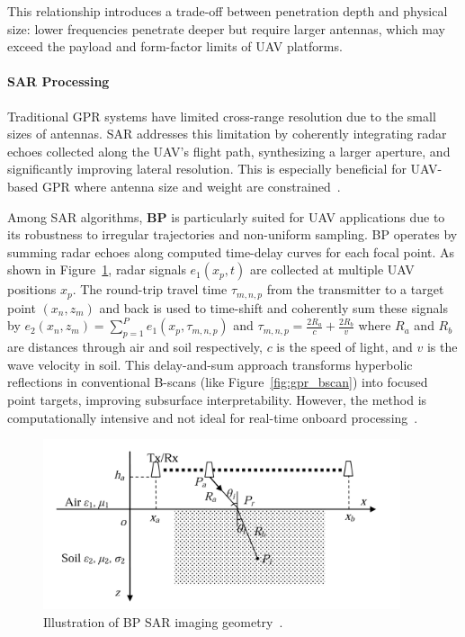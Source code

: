 This relationship introduces a trade-off between penetration depth and physical size: lower frequencies penetrate deeper but require larger antennas, which may exceed the payload and form-factor limits of \gls{UAV} platforms.


\paragraph{SAR Processing}

Traditional \gls{GPR} systems have limited cross-range resolution due to the small sizes of antennas. \gls{SAR} addresses this limitation by coherently integrating radar echoes collected along the \gls{UAV}’s flight path, synthesizing a larger aperture, and significantly improving lateral resolution. This is especially beneficial for \gls{UAV}-based \gls{GPR} where antenna size and weight are constrained~\cite{9758040}.

Among \gls{SAR} algorithms, \textbf{\gls{BP}} is particularly suited for \gls{UAV} applications due to its robustness to irregular trajectories and non-uniform sampling. \gls{BP} operates by summing radar echoes along computed time-delay curves for each focal point. As shown in Figure~\ref{fig:bp_geometry}, radar signals $e_1(x_p, t)$ are collected at multiple \gls{UAV} positions $x_p$. The round-trip travel time $\tau_{m,n,p}$ from the transmitter to a target point $(x_n, z_m)$ and back is used to time-shift and coherently sum these signals by \(e_2(x_n, z_m) = \sum_{p=1}^{P} e_1(x_p, \tau_{m,n,p})\) and \(\tau_{m,n,p} = \frac{2R_a}{c} + \frac{2R_b}{v}\) where $R_a$ and $R_b$ are distances through air and soil respectively, $c$ is the speed of light, and $v$ is the wave velocity in soil. This delay-and-sum approach transforms hyperbolic reflections in conventional B-scans (like Figure~\ref{fig:gpr_bscan}) into focused point targets, improving subsurface interpretability. However, the method is computationally intensive and not ideal for real-time onboard processing~\cite{lei2014multi}.

\begin{figure}[H]
    \centering
    \includegraphics[height=5cm]{figs/Huirui/bp_geometry.png}
    \caption[BP SAR imaging geometry]{Illustration of BP SAR imaging geometry~\cite{lei2014multi}.}
    \label{fig:bp_geometry}
\end{figure}


